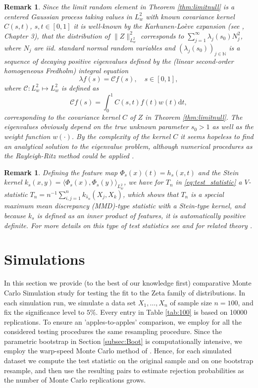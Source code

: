 \documentclass{article}
\theoremstyle{thm}
\theoremstyle{def}
\newtheorem{remark}[theorem]{Remark}
\newcommand{\N}{\mathbb{N}} %
\begin{document}
\begin{remark}\label{rem:KLE}
    Since the limit random element in Theorem \ref{thm:limitnull} is a centered Gaussian process taking values in $L^2_w$ with known covariance kernel $C(s,t)$, $s,t\in[0,1]$ it is well-known by the Karhunen-Loève expansion (see \cite{DW:2014}, Chapter 3), that the distribution of $\|Z\|^2_{L^2_w}$ corresponds to $\sum_{j=1}^\infty \lambda_j(s_0) N_j^2$, where $N_j$ are iid. standard normal random variables and $(\lambda_j(s_0))_{j\in\N}$ is a sequence of decaying positive eigenvalues defined by the (linear second-order homogeneous Fredholm) integral equation
\begin{equation*}\label{int:eq}
\lambda f(s) = \mathcal{C} f(s), \quad s \in [0,1],
\end{equation*}
where $\mathcal{C}: L^2_w \mapsto L^2_w$ is defined as
\[
\mathcal{C} f(s) = \int_0^1 C(s,t) f(t) w(t)\mbox{d}t,
\]
corresponding to the covariance kernel $C$ of $Z$ in Theorem \ref{thm:limitnull}. The eigenvalues obviously depend on the true unknown parameter $s_0>1$ as well as the weight function $w(\cdot)$. By the complexity of the kernel $C$ it seems hopeless to find an analytical solution to the eigenvalue problem, although numerical procedures as the Rayleigh-Ritz method could be applied \citep{EJM:2025}.
\end{remark}

\begin{remark}
    Defining the feature map $\Phi_s(x)(t)=h_s(x,t)$ and the Stein kernel $k_s(x,y)=\langle\Phi_s(x),\Phi_s(y)\rangle_{L^2_w}$, we have for
    $T_n$ in \eqref{eq:test_statistic} a $V$-statistic $T_n=n^{-1}\sum_{i,j=1}^nk_{\widehat{s}_n}(X_j,X_k)$, which shows that $T_n$ is a special maximum mean discrepancy (MMD)-type statistic with a Stein-type kernel, and because $k_s$ is defined as an inner product of features, it is automatically positive definite. For more details on this type of test statistics see \cite{KGBF:2025} and for related theory \cite{BRB:2025}.
\end{remark}

\section{Simulations}\label{sec:Simu}

In this section we provide (to the best of our knowledge first) comparative Monte Carlo Simulation study for testing the fit to the Zeta family of distributions. In each simulation run, we simulate a data set $X_1,\ldots,X_n$ of sample size $n=100$, and fix the significance level to $5\%$. Every entry in Table \ref{tab:100} is based on 10000 replications. To ensure an 'apples-to-apples' comparison, we employ for all the considered testing procedures the same resampling procedure. Since the parametric bootstrap in Section \ref{subsec:Boot} is computationally intensive, we employ the warp-speed
Monte Carlo method of \citet{GPW:2013}. Hence, for each simulated dataset we compute
the test statistic on the original sample and on one bootstrap resample, and then use the
resulting pairs to estimate rejection probabilities as the number of Monte Carlo
replications grows.
\end{document}
